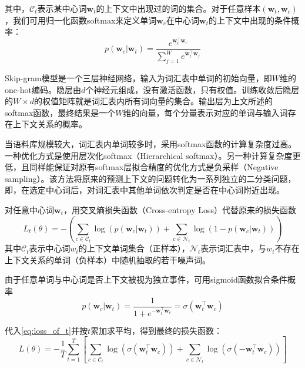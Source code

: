 其中，$\mathcal{C}_t$表示某中心词$\mathbf{w}_t$的上下文中出现过的词的集合。对于任意样本$(\mathbf{\mathbf{w}}_t,\mathbf{\mathbf{w}}_c)$，我们可用归一化函数softmax来定义单词$\mathbf{w}_c$在中心词$\mathbf{\mathbf{w}}_t$的上下文中出现的条件概率：
\begin{equation}
    \label{eq:softmax}
    p(\mathbf{w}_c | \mathbf{w}_t)=\frac{ e^{ \mathbf{w}_t^{\top} \mathbf{w}_c} }{ \sum_{j=1}^W e^{\mathbf{w}_t^{\top} \mathbf{w}_j}} 
\end{equation}

Skip-gram模型是一个三层神经网络，输入为词汇表中单词的初始向量，即$W$维的one-hot编码。隐层由$d$个神经元组成，没有激活函数，只有权值。训练收敛后隐层的$W\times d$的权值矩阵就是词汇表内所有词向量的集合。输出层为上文所述的softmax函数，最终结果是一个$W$维的向量，每个分量表示对应的单词与输入词存在上下文关系的概率。

当语料库规模较大，词汇表内单词较多时，采用softmax函数的计算复杂度过高。一种优化方式是使用层次化softmax（Hierarchical softmax）\cite{Hierarchical_softmax}。另一种计算复杂度更低，且同样能保证对原有softmax层拟合精度的优化方式是负采样（Negative sampling）。该方法将原来的预测上下文的问题转化为一系列独立的二分类问题，即，在选定中心词后，对词汇表中其他单词依次判定是否在中心词附近出现。


对任意中心词$\mathbf{w}_t$，用交叉熵损失函数（Cross-entropy Loss）代替原来的损失函数
\begin{equation}
    \label{eq:loss_of_t}
    L_t(\theta) = -\left( 
        \sum_{c \in \mathcal{C}_t} \log(p(\mathbf{w}_c | \mathbf{w}_t))+\sum_{c \in \mathcal{N}_t} \log(1-p(\mathbf{w}_c | \mathbf{w}_t)) 
    \right)
\end{equation}
其中$\mathcal{C}_t$表示中心词$w_t$的上下文单词集合（正样本），$\mathcal{N}_t$表示词汇表中，与$w_t$不存在上下文关系的单词（负样本）中随机抽取的若干噪声词。

由于任意单词与中心词是否上下文被视为独立事件，可用sigmoid函数拟合条件概率
\begin{equation}
    p(\mathbf{w}_c | \mathbf{w}_t) = \frac{1}{1+e^{-\mathbf{w}_t^{\top} \mathbf{w}_c}} = \sigma(\mathbf{w}_t^{\top} \mathbf{w}_c)
\end{equation}

代入\ref{eq:loss_of_t}并按$t$累加求平均，得到最终的损失函数：
\begin{equation}
    L(\theta) = -\frac{1}{T}\sum_{t=1}^{T} \left[
        \sum_{c \in \mathcal{C}_t} \log(\sigma(\mathbf{w}_t^{\top} \mathbf{w}_c)) + \sum_{c \in \mathcal{N}_t} \log(\sigma(-\mathbf{w}_t^{\top} \mathbf{w}_c))
    \right]
\end{equation}

